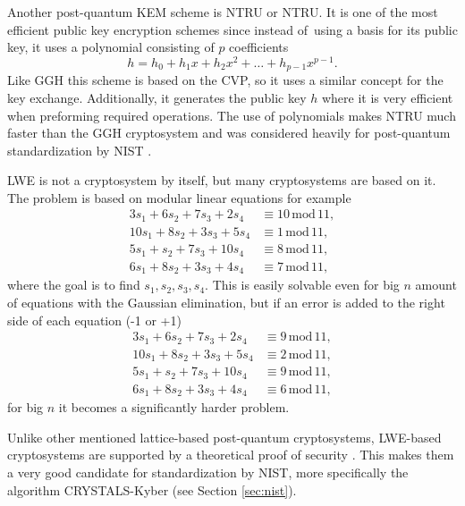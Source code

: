Another post-quantum KEM scheme is NTRU or \acl{NTRU}. It is one of the most efficient public key encryption schemes since instead of~using a basis for its public key, it uses a polynomial consisting of $p$ coefficients
\begin{equation}
  h=h_0+h_1x+h_2x^2+\dots+h_{p-1}x^{p-1}.
\end{equation}
Like GGH this scheme is based on the CVP, so it uses a similar concept for the key exchange. Additionally, it generates the public key $h$ where it is very efficient when preforming required operations. The use of polynomials makes NTRU much faster than the GGH cryptosystem and was considered heavily for post-quantum standardization by NIST \cite{Bernstein149}.

LWE is not a cryptosystem by itself, but many cryptosystems are based on it. The problem is based on modular linear equations for example
\begin{align}
  3s_1+6s_2+7s_3+2s_4  & \equiv 10\,\mathrm{mod}\,11, \\
  10s_1+8s_2+3s_3+5s_4 & \equiv 1\,\mathrm{mod}\,11,  \\
  5s_1+s_2+7s_3+10s_4  & \equiv 8\,\mathrm{mod}\,11,  \\
  6s_1+8s_2+3s_3+4s_4  & \equiv 7\,\mathrm{mod}\,11,
\end{align}
where the goal is to find $s_1, s_2, s_3, s_4$. This is easily solvable even for big $n$ amount of equations with the Gaussian elimination, but if an error is added to the right side of each equation (-1 or +1)
\begin{align}
  3s_1+6s_2+7s_3+2s_4  & \equiv 9\,\mathrm{mod}\,11, \\
  10s_1+8s_2+3s_3+5s_4 & \equiv 2\,\mathrm{mod}\,11, \\
  5s_1+s_2+7s_3+10s_4  & \equiv 9\,\mathrm{mod}\,11, \\
  6s_1+8s_2+3s_3+4s_4  & \equiv 6\,\mathrm{mod}\,11,
\end{align}
for big $n$ it becomes a significantly harder problem. \cite{Regev2005}

Unlike other mentioned lattice-based post-quantum cryptosystems, LWE-based cryptosystems are supported by a theoretical proof of security \cite{Bernstein2009}. This makes them a very good candidate for standardization by NIST, more specifically the algorithm CRYSTALS-Kyber (see Section \ref{sec:nist}).
